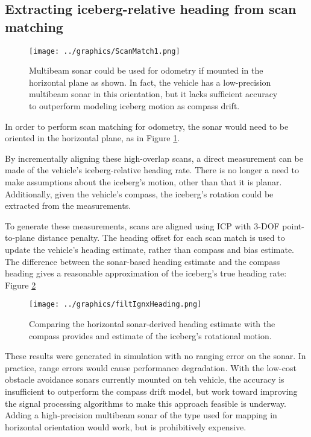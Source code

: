 \subsection{Extracting iceberg-relative heading from scan matching}

\begin{figure}[h]
   \centering
   \texttt{[image: ../graphics/ScanMatch1.png]} %
   \caption{Multibeam sonar could be used for odometry if mounted in the horizontal plane as shown. In fact, the vehicle has a low-precision multibeam sonar in this orientation, but it lacks sufficient accuracy to outperform modeling iceberg motion as compass drift.}
   \label{fig:ScanMatchMultibeam}
\end{figure}

In order to perform scan matching for odometry, the sonar would need to be oriented in the horizontal plane, as in Figure \ref{fig:ScanMatchMultibeam}. 

By incrementally aligning these high-overlap scans, a direct measurement can be made of the vehicle's iceberg-relative heading rate. There is no longer a need to make assumptions about the iceberg's motion, other than that it is planar. Additionally, given the vehicle's compass, the iceberg's rotation could be extracted from the measurements.

To generate these measurements, scans are aligned using ICP with 3-DOF point-to-plane distance penalty. The heading offset for each scan match is used to update the vehicle's heading estimate, rather than compass and bias estimate. The difference between the sonar-based heading estimate and the compass heading gives a reasonable approximation of the iceberg's true heading rate: Figure \ref{fig:filtIgnx}


\begin{figure}[h]
   \centering
   \texttt{[image: ../graphics/filtIgnxHeading.png]} %
   \caption{Comparing the horizontal sonar-derived heading estimate with the compass provides and estimate of the iceberg's rotational motion.}
   \label{fig:filtIgnx}
\end{figure}

These results were generated in simulation with no ranging error on the sonar. In practice, range errors would cause performance degradation. With the low-cost obstacle avoidance sonars currently mounted on teh vehicle, the accuracy is insufficient to outperform the compass drift model, but work toward improving the signal processing algorithms to make this approach feasible is underway. Adding a high-precision multibeam sonar of the type used for mapping in horizontal orientation would work, but is prohibitively expensive.

